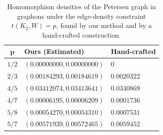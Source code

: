 \documentclass{article}
\theoremstyle{plain}
\theoremstyle{definition}
\theoremstyle{remark}
\begin{document}
\begin{table}[t]
    \centering
  \caption{Homomorphism densities of the Petersen graph in graphons under the edge-density constraint $t(K_2, W)=p$, found by our method and by a hand-crafted construction. \label{tab:petersenresult2}}
  {\small
    \begin{tabular}{cll}
         \toprule
         $\mathbf{p}$ & \textbf{Ours (Estimated)} & \textbf{Hand-crafted} 
         \\ \midrule
         $1/2$ & $(\mathit{0.00000000}, \mathit{0.00000000})$ & $0$
         \\
         $2/3$ & $(\mathit{0.00184293}, \mathit{0.00184619})$ & $0.0020322$
         \\
         $4/5$ & $(\mathit{0.03412074}, \mathit{0.03413641})$ & $0.0340869$
         \\
         $4/7$ & $(\mathit{0.00006195}, \mathit{0.00006209})$ & $0.0001736$
         \\
         $5/8$ & $(\mathit{0.00054270}, \mathit{0.00054310})$ & $0.0007531$
         \\
         $5/7$ & $(\mathit{0.00571939}, \mathit{0.00572465})$ & $0.0059452$
         \\
         \bottomrule
    \end{tabular}
    }
\end{table}
\end{document}
